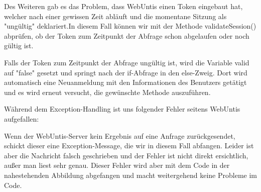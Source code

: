 Des Weiteren gab es das Problem, dass WebUntis einen Token eingebaut hat, welcher nach einer gewissen Zeit abläuft und die momentane Sitzung als "ungültig" deklariert.In diesem Fall können wir mit der Methode validateSession() abprüfen, ob der Token zum Zeitpunkt der Abfrage schon abgelaufen oder noch gültig ist. 



Falls der Token zum Zeitpunkt der Abfrage ungültig ist, wird die Variable valid auf "false" gesetzt und springt nach der if-Abfrage in den else-Zweig. Dort wird automatisch eine Neuanmeldung mit den Informationen des Benutzers getätigt und es wird erneut versucht, die gewünschte Methode auszuführen.

\pagebreak

Während dem Exception-Handling ist uns folgender Fehler seitens WebUntis aufgefallen:


Wenn der WebUntis-Server kein Ergebnis auf eine Anfrage zurückgesendet, schickt dieser eine Exception-Message, die wir in diesem Fall abfangen. Leider ist aber die Nachricht falsch geschrieben und der Fehler ist nicht direkt ersichtlich, außer man liest sehr genau. Dieser Fehler wird aber mit dem Code in der nahestehenden Abbildung abgefangen und macht weitergehend keine Probleme im Code.